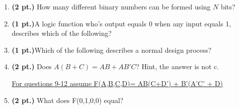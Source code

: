 \documentclass{article}
\begin{document}
\begin{enumerate}
\item {\bf (2 pt.)} How many different binary numbers can be formed
using $N$ bits?

\item {\bf (1 pt.)}A logic function who's output equals 0 when any
input equals 1, describes which of the following?

\item {\bf (1 pt.)}Which of the following describes a normal
design process?


\item {\bf (2 pt.)} Does  $A(B+C)=AB+AB'C$?
Hint, the answer is not c.
\pagebreak
\underline{For questions 9-12 assume F(A,B,C,D)= AB(C+D') + B'(A'C' + D)}

\item {\bf (2 pt.)} What does F(0,1,0,0) equal?


\end{enumerate}
\end{document}
